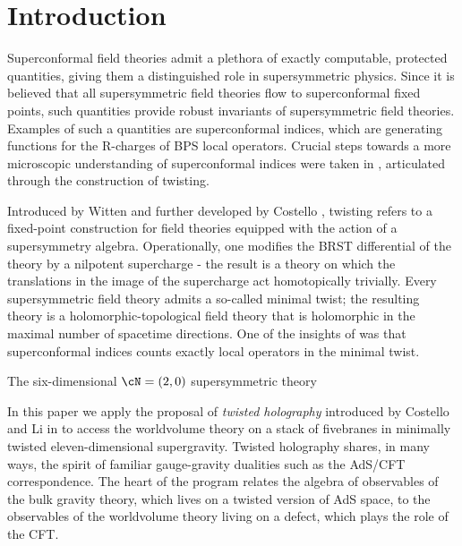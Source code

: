 %
%
%

\section{Introduction}
Superconformal field theories admit a plethora of exactly computable, protected quantities, giving them a distinguished role in supersymmetric physics. Since it is believed that all supersymmetric field theories flow to superconformal fixed points, such quantities provide robust invariants of supersymmetric field theories. Examples of such a quantities are superconformal indices, which are generating functions for the R-charges of BPS local operators. Crucial steps towards a more microscopic understanding of superconformal indices were taken in \cite{}, articulated through the construction of twisting.

Introduced by Witten \cite{} and further developed by Costello \cite{}, twisting refers to a fixed-point construction for field theories equipped with the action of a supersymmetry algebra. Operationally, one modifies the BRST differential of the theory by a nilpotent supercharge - the result is a theory on which the translations in the image of the supercharge act homotopically trivially. Every supersymmetric field theory admits a so-called minimal twist; the resulting theory is a holomorphic-topological field theory that is holomorphic in the maximal number of spacetime directions. One of the insights of \cite{} was that superconformal indices counts exactly local operators in the minimal twist.





The six-dimensional $\cN=(2,0)$ supersymmetric theory 


In this paper we apply the proposal of \textit{twisted holography} introduced by Costello and Li in \cite{CLsugra} to access the worldvolume theory on a stack of fivebranes in minimally twisted eleven-dimensional supergravity.
Twisted holography shares, in many ways, the spirit of familiar gauge-gravity dualities such as the AdS/CFT correspondence. 
The heart of the program relates the algebra of observables of the bulk gravity theory, which lives on a twisted version of AdS space, to the observables of the worldvolume theory living on a defect, which plays the role of the CFT.


%
